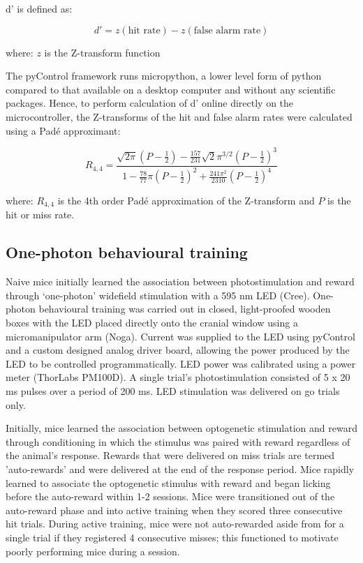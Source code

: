 d' is defined as:

\begin{equation}
d' = z(\text{hit rate}) - z(\text{false alarm rate})
\end{equation}

where: $z$ is the Z-transform function

The pyControl framework runs micropython, a lower level form of python compared to that available on a desktop computer and without any scientific packages. Hence, to perform calculation of d' online directly on the microcontroller, the Z-transforms of the hit and false alarm rates were calculated using a Pad\'e approximant:

\begin{equation} \label{eq:pade}
 R_{4,4} = \frac{\sqrt{2\pi}(P - \frac{1}{2}) - \frac{157}{231}\sqrt{2}\pi^{3/2}(P - \frac{1}{2})^{3}}{1-\frac{78}{77}\pi(P-\frac{1}{2})^{2} + \frac{241\pi^{2}}{2310}(P - \frac{1}{2})^{4}}
\end{equation}

where: $R_{4,4}$ is the 4th order Pad\'e approximation of the Z-transform and $P$ is the hit or miss rate.

\subsection{One-photon behavioural training}

Naive mice initially learned the association between photostimulation and reward through ‘one-photon’ widefield stimulation with a 595 nm LED (Cree). One-photon behavioural training was carried out in closed, light-proofed wooden boxes with the LED placed directly onto the cranial window using a micromanipulator arm (Noga). Current was supplied to the LED using pyControl and a custom designed analog driver board, allowing the power produced by the LED to be controlled programmatically. LED power was calibrated using a power meter (ThorLabs PM100D). A single trial's photostimulation consisted of 5 x 20 ms pulses over a period of 200 ms. LED stimulation was delivered on go trials only.

Initially, mice learned the association between optogenetic stimulation and reward through conditioning in which the stimulus was paired with reward regardless of the animal's response. Rewards that were delivered on miss trials are termed 'auto-rewards' and were delivered at the end of the response period. Mice rapidly learned to associate the optogenetic stimulus with reward and began licking before the auto-reward within 1-2 sessions. Mice were transitioned out of the auto-reward phase and into active training when they scored three consecutive hit trials. During active training, mice were not auto-rewarded aside from for a single trial if they registered 4 consecutive misses; this functioned to motivate poorly performing mice during a session.


